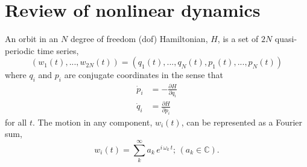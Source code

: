 \documentclass[letterpaper,12pt,preprint]{aastex}
\begin{document}
\section{Review of nonlinear dynamics}\label{sec:nldreview}


An orbit in an $N$ degree of freedom (dof) Hamiltonian, $H$, is a set of $2N$ quasi-periodic time series, 
\begin{equation}
(w_1(t),...,w_{2N}(t)) = (q_1(t),...,q_{N}(t),p_1(t),...,p_{N}(t)) \label{eq:coords}
\end{equation}
where $q_i$ and $p_i$ are conjugate coordinates in the sense that
\begin{align}
	\dot{p}_i &= -\frac{\partial H}{\partial q_i}\\
	\dot{q}_i &= \frac{\partial H}{\partial p_i}
\end{align}
for all $t$. The motion in any component, $w_i(t)$, can be represented as a Fourier sum,
\begin{equation}
	w_i(t) = \sum_k^\infty a_k \, e^{i\,\omega_k\,t}; \, (a_k \in \mathbb{C}). \label{eq:fourier}
\end{equation}
\end{document}
